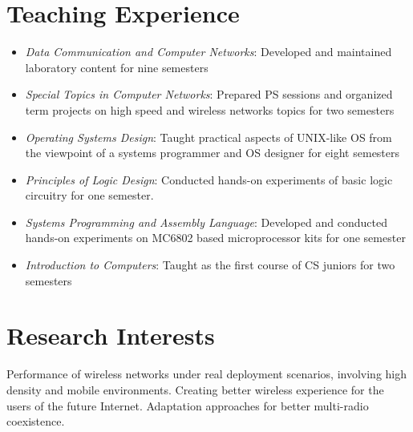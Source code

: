 \documentclass[10pt]{article}
\begin{document}
\section{Teaching Experience}
\begin{itemize}
\item \emph{Data Communication and Computer Networks}: Developed and maintained
laboratory content for nine semesters\vspace{-2mm}
\item \emph{Special Topics in Computer Networks}: Prepared PS sessions and
organized term projects on high speed and wireless networks topics for two
semesters\vspace{-2mm}
\item \emph{Operating Systems Design}: Taught practical aspects of UNIX-like
OS from the viewpoint of a systems programmer and OS designer for eight
semesters\vspace{-2mm}
\item \emph{Principles of Logic Design}: Conducted hands-on experiments of
basic logic circuitry for one semester.\vspace{-2mm}
\item \emph{Systems Programming and Assembly Language}: Developed and
conducted hands-on experiments on MC6802 based microprocessor kits for one
semester\vspace{-2mm}
\item \emph{Introduction to Computers}: Taught as the first course of CS
juniors for two semesters
\end{itemize}


\section{Research Interests}
\noindent Performance of wireless networks under real deployment
scenarios, involving high density and mobile environments. Creating better
wireless experience for the users of the future Internet. Adaptation approaches
for better multi-radio coexistence.
\end{document}
